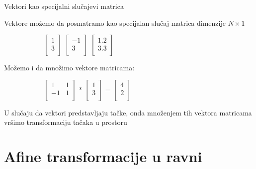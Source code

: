 \documentclass[bookmarks=true,bookmarksopen=true,pdfborder={0 0 0},pdfhighlight={/N},linkbordercolor={.5 .5 .5},implicit=false,unicode,xcolor={table}]{beamer}
\begin{document}
\begin{frame}{Vektori kao specijalni slučajevi matrica}

  Vektore možemo da posmatramo kao specijalan slučaj matrica dimenzije $N \times 1$
  \begin{figure}
    \begin{subfigure}{10cm}
      $\begin{bmatrix}
        1\\
        3\\
        \end{bmatrix}$
      $\begin{bmatrix}
        -1\\
        3\\
        \end{bmatrix}$
      $\begin{bmatrix}
        1.2\\
        3.3\\
        \end{bmatrix}$
    \end{subfigure}
  \end{figure}
  Možemo i da množimo vektore matricama:
  \begin{figure}
    \begin{subfigure}{5cm}
      $\begin{bmatrix}
        1 & 1\\
        -1 & 1\\
        \end{bmatrix}$
      *
      $\begin{bmatrix}
        1\\
        3\\
        \end{bmatrix}$
      =
      $\begin{bmatrix}
        4\\
        2\\
        \end{bmatrix}$
    \end{subfigure}
  \end{figure}
  U slučaju da vektori predstavljaju tačke, onda množenjem tih vektora matricama vršimo transformaciju tačaka u prostoru
  
\end{frame}

\section{Afine transformacije u ravni}
\end{document}

